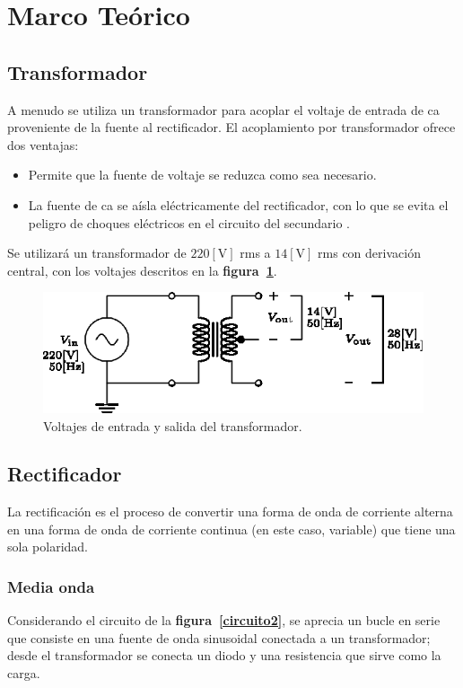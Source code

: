 \documentclass[letter,twoside,11pt]{article}
\begin{document}
\section{Marco Teórico}

\subsection{Transformador}
A menudo se utiliza un transformador para acoplar el voltaje de entrada de ca
proveniente de la fuente al rectificador. El acoplamiento por transformador
ofrece dos ventajas:

\begin{itemize}
    \item Permite que la fuente de voltaje se reduzca como sea necesario.
    \item La fuente de ca se aísla eléctricamente del rectificador, con lo que
        se evita el peligro de choques eléctricos en el circuito del
        secundario \cite{Floyd}.
\end{itemize}

Se utilizará un transformador de $220[\text{V}]$ rms a
$14[\text{V}]$ rms con derivación central, con los voltajes descritos en la
\textbf{figura~\ref{circuito1}}.

\begin{figure}[!h]
\centering
\includegraphics[scale=1.25]{01.transformador1.eps}
\caption{Voltajes de entrada y salida del transformador.}
\label{circuito1}
\end{figure}

\subsection{Rectificador}
La rectificación es el proceso de convertir una forma de onda de corriente
alterna en una forma de onda de corriente continua (en este caso, variable) que
tiene una sola polaridad.

\subsubsection{Media onda}
Considerando el circuito de la \textbf{figura~\ref{circuito2}}, se aprecia un
bucle en serie que consiste en una fuente de onda sinusoidal conectada a un
transformador; desde el transformador se conecta un diodo y una resistencia que
sirve como la carga.
\end{document}
